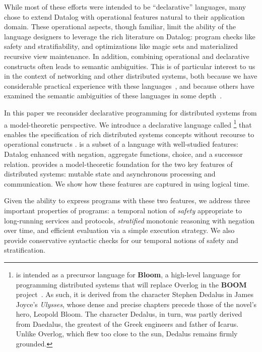 While most of these efforts were intended to be ``declarative''
languages, many chose to extend Datalog with operational features
natural to their application domain.  These operational aspects,
though familiar, limit the ability of the language designers to
leverage the rich literature on Datalog: program checks like safety
and stratifiability, and optimizations like magic sets and
materialized recursive view maintenance.  In addition, combining
operational and declarative constructs often
leads to semantic ambiguities.  This is of particular interest to us
in the context of networking and other distributed systems, both
because we have considerable practical experience with these
languages~\cite{boom-eurosys,Loo2009-CACM}, and because others have
examined the semantic ambiguities of these languages in some
depth~\cite{Mao2009,navarro}.

In this paper we reconsider declarative programming for distributed
systems from a model-theoretic perspective. We introduce a declarative
language called \lang\footnote{\small \lang is intended as a precursor
  language for \textbf{Bloom}, a high-level language for programming
  distributed systems that will replace Overlog in the \textbf{BOOM}
  project~\cite{boom-eurosys}.  As such, it is derived from the
  character Stephen Dedalus in James Joyce's \emph{Ulysses}, whose
  dense and precise chapters precede those of the novel's hero,
  Leopold Bloom.  The character Dedalus, in turn, was partly derived
  from Daedalus, the greatest of the Greek engineers and father of
  Icarus.  Unlike Overlog, which flew too close to the sun, Dedalus
  remains firmly grounded.  } that enables the specification of rich
distributed systems concepts without recourse to operational
constructs .  \lang is a subset of a language with well-studied
features: Datalog enhanced with negation, aggregate functions, choice,
and a successor relation.   \lang provides a model-theoretic foundation
for the two key features of distributed systems: mutable state and
asynchronous processing and communication.  We show how these features
are captured in \lang using logical time. 

Given the ability to express programs with these two features, we
address three important properties of \lang programs: a temporal
notion of {\em safety} appropriate to long-running services and
protocols, {\em stratified} monotonic reasoning with negation over
time, and efficient evaluation via a simple execution strategy.  We
also provide conservative syntactic checks for our temporal notions of
safety and stratification.

